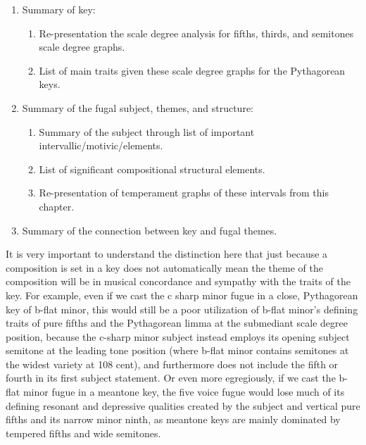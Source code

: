 \begin{enumerate}
\def\labelenumi{\arabic{enumi}.}
\tightlist
\item
  Summary of key:

  \begin{enumerate}
  \def\labelenumii{\arabic{enumii}.}
  \tightlist
  \item
    Re-presentation the scale degree analysis for fifths, thirds, and
    semitones scale degree graphs.
  \item
    List of main traits given these scale degree graphs for the
    Pythagorean keys.
  \end{enumerate}
\item
  Summary of the fugal subject, themes, and structure:

  \begin{enumerate}
  \def\labelenumii{\arabic{enumii}.}
  \tightlist
  \item
    Summary of the subject through list of important
    intervallic/motivic/elements.
  \item
    List of significant compositional structural elements.
  \item
    Re-presentation of temperament graphs of these intervals from this
    chapter.
  \end{enumerate}
\item
  Summary of the connection between key and fugal themes.
\end{enumerate}

It is very important to understand the distinction here that just
because a composition is set in a key does not automatically mean the
theme of the composition will be in musical concordance and sympathy
with the traits of the key. For example, even if we cast the c sharp
minor fugue in a close, Pythagorean key of b-flat minor, this would
still be a poor utilization of b-flat minor's defining traits of pure
fifths and the Pythagorean limma at the submediant scale degree
position, because the c-sharp minor subject instead employs its opening
subject semitone at the leading tone position (where b-flat minor
contains semitones at the widest variety at 108 cent), and furthermore
does not include the fifth or fourth in its first subject statement. Or
even more egregiously, if we cast the b-flat minor fugue in a meantone
key, the five voice fugue would lose much of its defining resonant and
depressive qualities created by the subject and vertical pure fifths and
its narrow minor ninth, as meantone keys are mainly dominated by
tempered fifths and wide semitones.

